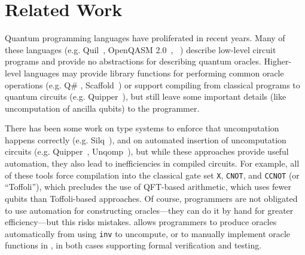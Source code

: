 \section{Related Work}
\label{sec:related}


Quantum programming languages have proliferated in recent years. 
Many of these languages (e.g. Quil~\cite{quilc}, OpenQASM 2.0~\cite{Cross2017}, \sqir~\cite{VOQC}) describe low-level circuit programs and provide no abstractions for describing quantum oracles.
Higher-level languages may provide library functions for performing common oracle operations (e.g. Q\# \cite{qsharp}, Scaffold~\cite{scaffold,scaffCCnew}) or support compiling from classical programs to quantum circuits (e.g. Quipper~\cite{Green2013}), but still leave some important details (like uncomputation of ancilla qubits) to the programmer.

There has been some work on type systems to enforce that uncomputation happens correctly (e.g. Silq~\cite{sliqlanguage}), and on automated insertion of uncomputation circuits (e.g. Quipper~\cite{Green2013}, Unqomp~\cite{unqomp}), but while these approaches provide useful automation, they also lead to inefficiencies in compiled circuits.
For example, all of these tools force compilation into the classical gate set \texttt{X}, \texttt{CNOT},  and \texttt{CCNOT} (or ``Toffoli''), which precludes the use of QFT-based arithmetic, which uses fewer qubits than Toffoli-based approaches.
Of course, programmers are not obligated to use automation for constructing oracles---they can do it by hand for greater efficiency---but this risks mistakes.
\name allows programmers to produce oracles automatically from \vqimp using \texttt{inv} to uncompute, or to manually implement oracle functions in \vqir, in both cases supporting formal verification and testing.




